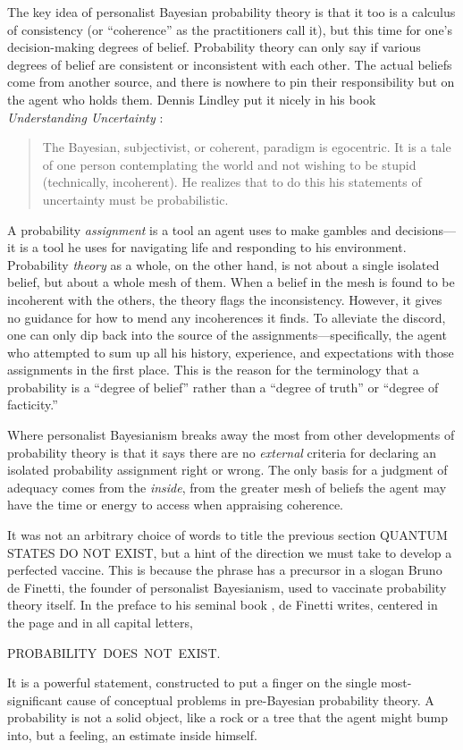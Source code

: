 The key idea of personalist Bayesian probability theory is that it too is a calculus of consistency (or ``coherence'' as the practitioners call it), but this time for one's decision-making degrees of belief.  Probability theory can only say if various degrees of belief are consistent or inconsistent with each other. The actual beliefs come from another source, and there is nowhere to pin their responsibility but on the agent who holds them.  Dennis Lindley put it nicely in his book {\sl Understanding Uncertainty\/} \cite{Lindley06}:
\begin{quote}\small
The Bayesian, subjectivist, or coherent, para\-digm is egocentric. It is a tale of one person contemplating the world and not wishing to be stupid (technically, incoherent). He realizes that to do this his statements of uncertainty must be probabilistic.
\end{quote}
A probability {\it assignment\/} is a tool an agent uses to make gambles and decisions---it is a tool he uses for navigating life and responding to his environment.  Probability {\it theory\/} as a whole, on the other hand, is not about a single isolated belief, but about a whole mesh of them.  When a belief in the mesh is found to be incoherent with the others, the theory flags the inconsistency.  However, it gives no guidance for how to mend any incoherences it finds.  To alleviate the discord, one can only dip back into the source of the assignments---specifically, the agent who attempted to sum up all his history, experience, and expectations with those assignments in the first place.  This is the reason for the terminology that a probability is a ``degree of belief'' rather than a ``degree of truth'' or ``degree of facticity.''

Where personalist Bayesianism breaks away the most from other developments of probability theory is that it says there are no {\it external\/} criteria for declaring an isolated probability assignment right or wrong.  The only basis for a judgment of adequacy comes from the {\it inside}, from the greater mesh of beliefs the agent may have the time or energy to access when appraising coherence.

It was not an arbitrary choice of words to title the previous section QUANTUM STATES DO NOT EXIST, but a hint of the direction we must take to develop a perfected vaccine.  This is because the phrase has a precursor in a slogan Bruno de Finetti, the founder of personalist Bayesianism, used to vaccinate probability theory itself.  In the preface to his seminal book \cite{DeFinetti90}, de Finetti writes, centered in the page and in all capital letters,
\begin{center}
PROBABILITY$\,$ DOES$\,$ NOT$\,$ EXIST.
\end{center}
It is a powerful statement, constructed to put a finger on the single most-significant cause of conceptual problems in pre-Bayesian probability theory.  A probability is not a solid object, like a rock or a tree that the agent might bump into, but a feeling, an estimate inside himself.

